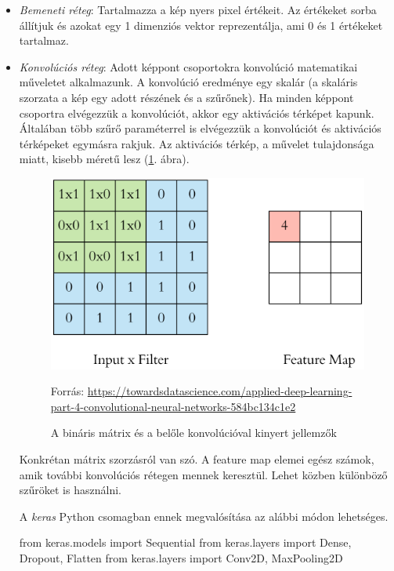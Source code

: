 \begin{itemize}
\item \textit{Bemeneti réteg}: Tartalmazza a kép nyers pixel értékeit. Az értékeket sorba állítjuk és azokat egy 1 dimenziós vektor reprezentálja, ami 0 és 1 értékeket tartalmaz.

\item \textit{Konvolúciós réteg}: Adott képpont csoportokra konvolúció matematikai műveletet alkalmazunk. A konvolúció eredménye egy skalár (a skaláris szorzata a kép egy adott részének és a szűrőnek). Ha minden képpont csoportra elvégezzük a konvolúciót, akkor egy aktivációs térképet kapunk. Általában több szűrő paraméterrel is elvégezzük a konvolúciót és aktivációs térképeket egymásra rakjuk. Az aktivációs térkép, a művelet tulajdonsága miatt, kisebb
méretű lesz (\ref{fig:convolution}. ábra).

\begin{figure}[h]
\centering
\includegraphics[scale=0.3]{images/convolution}
\caption{A bináris mátrix és a belőle konvolúcióval kinyert jellemzők}
Forrás: \url{https://towardsdatascience.com/applied-deep-learning-part-4-convolutional-neural-networks-584bc134c1e2}
\label{fig:convolution}
\end{figure}

Konkrétan mátrix szorzásról van szó. A feature map elemei egész számok, amik további konvolúciós rétegen mennek keresztül. Lehet közben különböző szűröket is használni.

A \textit{keras} Python csomagban ennek megvalósítása az alábbi módon lehetséges.
\begin{python}
from keras.models import Sequential
from keras.layers import Dense, Dropout, Flatten
from keras.layers import Conv2D, MaxPooling2D


\end{python}
\end{itemize}
